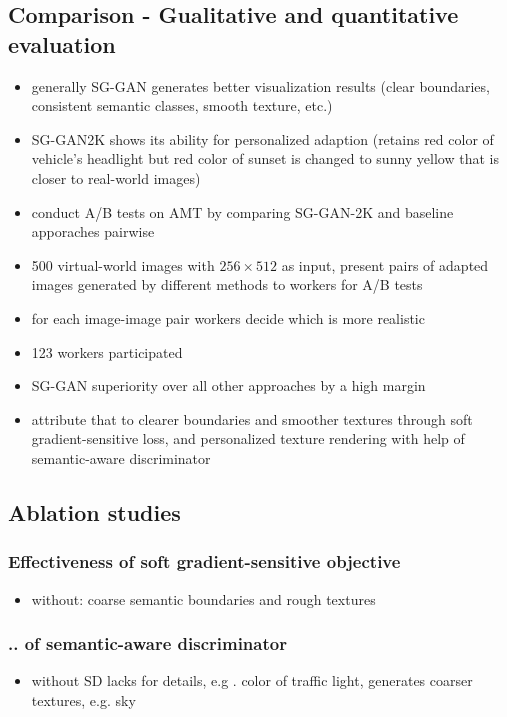 \subsection{Comparison - Gualitative and quantitative evaluation}
\begin{itemize}
	\item generally SG-GAN generates better visualization results (clear boundaries, consistent semantic classes, smooth texture, etc.)
	\item SG-GAN2K shows its ability for personalized adaption (retains red color of vehicle's headlight but red color of sunset is changed to sunny yellow that is closer to real-world images)
	\item conduct A/B tests on AMT by comparing SG-GAN-2K and baseline apporaches pairwise
	\item 500 virtual-world images with $256 \times 512$ as input, present pairs of adapted images generated by different methods to workers for A/B tests
	\item for each image-image pair workers decide which is more realistic
	\item 123 workers participated 
	\item SG-GAN superiority over all other approaches by a high margin
	\item attribute that to clearer boundaries and smoother textures through soft gradient-sensitive loss, and personalized texture rendering with help of semantic-aware discriminator
\end{itemize}

\subsection{Ablation studies}
\subsubsection{Effectiveness of soft gradient-sensitive objective}
\begin{itemize}
	\item without: coarse semantic boundaries and rough textures
\end{itemize}

\subsubsection{.. of semantic-aware discriminator}
\begin{itemize}
	\item without SD lacks for details, e.g . color of traffic light, generates coarser textures, e.g. sky
\end{itemize}

